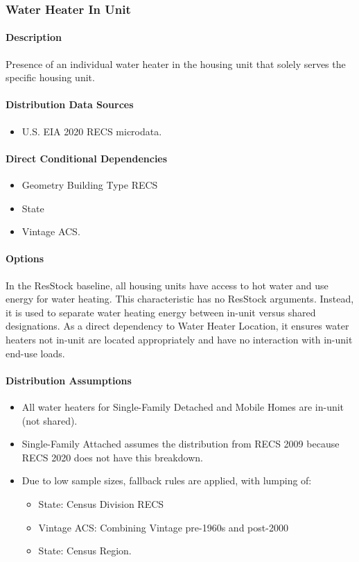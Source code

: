 \subsubsection{Water Heater In Unit}\label{water_heater_in_unit}
\paragraph{Description}
Presence of an individual water heater in the housing unit that solely serves the specific housing unit.

\paragraph{Distribution Data Sources}
\begin{itemize}
\item
  U.S. EIA 2020 RECS microdata.
\end{itemize}

\paragraph{Direct Conditional Dependencies}
\begin{itemize}
    \item Geometry Building Type RECS
    \item State
    \item Vintage ACS.
\end{itemize}

\paragraph{Options}
In the ResStock baseline, all housing units have access to hot water and use energy for water heating. This characteristic has no ResStock arguments. Instead, it is used to separate water heating energy between in-unit versus shared designations. As a direct dependency to Water Heater Location, it ensures water heaters not in-unit are located appropriately and have no interaction with in-unit end-use loads.

\paragraph{Distribution Assumptions}
\begin{itemize}
\item
  All water heaters for Single-Family Detached and Mobile Homes are in-unit (not shared).
\item
  Single-Family Attached assumes the distribution from RECS 2009 because RECS 2020 does not have this breakdown.
\item
  Due to low sample sizes, fallback rules are applied, with lumping of:

  \begin{itemize}
  \item
    State: Census Division RECS
  \item
    Vintage ACS: Combining Vintage pre-1960s and post-2000
  \item
    State: Census Region.
  \end{itemize}
\end{itemize}

